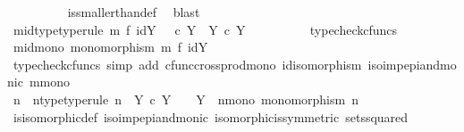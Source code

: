 \begin{isabellebody}
\ \ \ \ \ \ \ \ \isamarkupfalse%
\ is{\isacharunderscore}{\kern0pt}smaller{\isacharunderscore}{\kern0pt}than{\isacharunderscore}{\kern0pt}def\ \isamarkupfalse%
\ blast\isanewline
\ \ \ \ \ \ \isamarkupfalse%
\ \isamarkupfalse%
\ m{\isacharunderscore}{\kern0pt}id{\isacharunderscore}{\kern0pt}type{\isacharbrackleft}{\kern0pt}type{\isacharunderscore}{\kern0pt}rule{\isacharbrackright}{\kern0pt}{\isacharcolon}{\kern0pt}\ {\isachardoublequoteopen}m\ {\isasymtimes}\isactrlsub f\ id{\isacharparenleft}{\kern0pt}Y{\isacharparenright}{\kern0pt}\ {\isacharcolon}{\kern0pt}\ {\isasymOmega}\ {\isasymtimes}\isactrlsub c\ Y\ {\isasymrightarrow}\ Y\ {\isasymtimes}\isactrlsub c\ Y{\isachardoublequoteclose}\isanewline
\ \ \ \ \ \ \ \ \isamarkupfalse%
\ typecheck{\isacharunderscore}{\kern0pt}cfuncs\isanewline
\ \ \ \ \ \ \isamarkupfalse%
\ m{\isacharunderscore}{\kern0pt}id{\isacharunderscore}{\kern0pt}mono{\isacharcolon}{\kern0pt}\ {\isachardoublequoteopen}monomorphism\ {\isacharparenleft}{\kern0pt}m\ {\isasymtimes}\isactrlsub f\ id{\isacharparenleft}{\kern0pt}Y{\isacharparenright}{\kern0pt}{\isacharparenright}{\kern0pt}{\isachardoublequoteclose}\isanewline
\ \ \ \ \ \ \ \ \isamarkupfalse%
\ {\isacharparenleft}{\kern0pt}typecheck{\isacharunderscore}{\kern0pt}cfuncs{\isacharcomma}{\kern0pt}\ simp\ add{\isacharcolon}{\kern0pt}\ cfunc{\isacharunderscore}{\kern0pt}cross{\isacharunderscore}{\kern0pt}prod{\isacharunderscore}{\kern0pt}mono\ id{\isacharunderscore}{\kern0pt}isomorphism\ iso{\isacharunderscore}{\kern0pt}imp{\isacharunderscore}{\kern0pt}epi{\isacharunderscore}{\kern0pt}and{\isacharunderscore}{\kern0pt}monic\ m{\isacharunderscore}{\kern0pt}mono{\isacharparenright}{\kern0pt}\ \ \isanewline
\ \ \ \ \ \ \isamarkupfalse%
\ n\ \ n{\isacharunderscore}{\kern0pt}type{\isacharbrackleft}{\kern0pt}type{\isacharunderscore}{\kern0pt}rule{\isacharbrackright}{\kern0pt}{\isacharcolon}{\kern0pt}\ {\isachardoublequoteopen}n\ {\isacharcolon}{\kern0pt}\ Y\ {\isasymtimes}\isactrlsub c\ Y\ \ {\isasymrightarrow}\ \ Y\isactrlbsup {\isasymOmega}\isactrlesup {\isachardoublequoteclose}\ \ n{\isacharunderscore}{\kern0pt}mono{\isacharcolon}{\kern0pt}\ {\isachardoublequoteopen}monomorphism\ n{\isachardoublequoteclose}\isanewline
\ \ \ \ \ \ \ \ \isamarkupfalse%
\ is{\isacharunderscore}{\kern0pt}isomorphic{\isacharunderscore}{\kern0pt}def\ iso{\isacharunderscore}{\kern0pt}imp{\isacharunderscore}{\kern0pt}epi{\isacharunderscore}{\kern0pt}and{\isacharunderscore}{\kern0pt}monic\ isomorphic{\isacharunderscore}{\kern0pt}is{\isacharunderscore}{\kern0pt}symmetric\ sets{\isacharunderscore}{\kern0pt}squared\ \isamarkupfalse%

\end{isabellebody}
